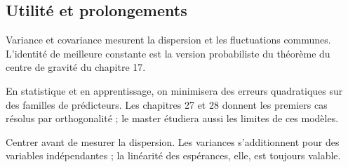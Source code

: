 \documentclass[../cours_1re.tex]{subfiles}
\begin{document}
\begin{finchapitre}
\section{Utilité et prolongements}
Variance et covariance mesurent la dispersion et les fluctuations communes.
L'identité de meilleure constante est la version probabiliste du théorème du
centre de gravité du chapitre 17.

En statistique et en apprentissage, on minimisera des erreurs quadratiques
sur des familles de prédicteurs. Les chapitres 27 et 28 donnent les premiers
cas résolus par orthogonalité ; le master étudiera aussi les limites de ces modèles.
\begin{retenir}
Centrer avant de mesurer la dispersion. Les variances s'additionnent
pour des variables indépendantes ; la linéarité des espérances, elle, est toujours valable.
\end{retenir}
\end{finchapitre}
\end{document}

